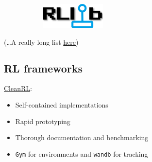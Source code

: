 \documentclass[
  letterpaper,
  DIV=11,
  numbers=noendperiod,
  oneside]{scrartcl}
\providecommand{\tightlist}{%
  \setlength{\itemsep}{0pt}\setlength{\parskip}{0pt}}\usepackage{longtable,booktabs,array}
\begin{document}
\begin{figure}
\begin{minipage}{0.50\linewidth}
\begin{figure}[H]

{\centering \includegraphics[width=\textwidth,height=0.52083in]{figs/package_rllib.png}

}


\end{figure}%

\end{minipage}%

\end{figure}%

(\ldots A really long list
\href{https://github.com/wwxFromTju/awesome-reinforcement-learning-lib}{here})

\subsection{RL frameworks}\label{rl-frameworks-1}

\href{https://docs.cleanrl.dev}{CleanRL}:

\begin{itemize}
\tightlist
\item
  Self-contained implementations
\item
  Rapid prototyping
\end{itemize}

\begin{itemize}
\tightlist
\item
  Thorough documentation and benchmarking
\item
  \texttt{Gym} for environments and \texttt{wandb} for tracking
\end{itemize}
\end{document}
